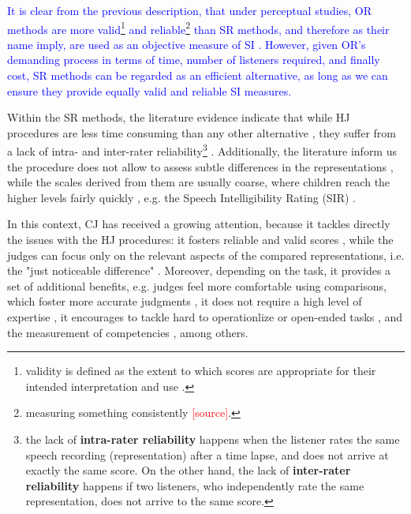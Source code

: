 \textcolor{blue}{ It is clear from the previous description, that under perceptual studies, OR methods are more valid\footnote{validity is defined as the extent to which scores are appropriate for their intended interpretation and use \citep{Lesterhuis_2018}.} and reliable\footnote{measuring something consistently \textcolor{red}{[source]}.} than SR methods, and therefore as their name imply, are used as an objective measure of SI \citep{Boonen_et_al_2021, Faes_et_al_2021}. However, given OR's demanding process in terms of time, number of listeners required, and finally cost, SR methods can be regarded as an efficient alternative, as long as we can ensure they provide equally valid and reliable SI measures. }

Within the SR methods, the literature evidence indicate that while HJ procedures are less time consuming than any other alternative \citep{Boonen_et_al_2021}, they suffer from a lack of intra- and inter-rater reliability\footnote{the lack of \textbf{intra-rater reliability} happens when the listener rates the same speech recording (representation) after a time lapse, and does not arrive at exactly the same score. On the other hand, the lack of \textbf{inter-rater reliability} happens if two listeners, who independently rate the same representation, does not arrive to the same score.} \citep{McLeod_et_al_2012, Johannisson_et_al_2014, Hustad_et_al_2020, Boonen_et_al_2021}. Additionally, the literature inform us the procedure does not allow to assess subtle differences in the representations \citep{Boonen_et_al_2021}, while the scales derived from them are usually coarse, where children reach the higher levels fairly quickly \citep{DeRaeve_2010}, e.g. the Speech Intelligibility Rating (SIR) \citep{Cox_et_al_1989, McDaniel_et_al_1992}.

In this context, CJ has received a growing attention, because it tackles directly the issues with the HJ procedures: it fosters reliable \citep{Verhavert_et_al_2019} and valid scores \citep{Bramley_2008, Lesterhuis_2018}, while the judges can focus only on the relevant aspects of the compared representations, i.e. the "just noticeable difference" \citep{Lesterhuis_2018}. Moreover, depending on the task, it provides a set of additional benefits, e.g. judges feel more comfortable using comparisons, which foster more accurate judgments \citep{Gill_et_al_2013}, it does not require a high level of expertise \citep{Lesterhuis_2018, Boonen_et_al_2020}, it encourages to tackle hard to operationlize or open-ended tasks \citep{Pollitt_2012a, Pollitt_2012b, Lesterhuis_2018}, and the measurement of competencies \citep{Verhavert_2018}, among others.
